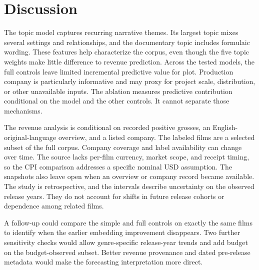 \section{Discussion}

The topic model captures recurring narrative themes. Its largest topic mixes
several settings and relationships, and the documentary topic includes
formulaic wording. These features help characterize the corpus, even though
the five topic weights make little difference to revenue prediction. Across
the tested models, the full controls leave limited incremental predictive
value for plot. Production company is particularly informative and may proxy
for project scale, distribution, or other unavailable inputs. The ablation
measures predictive contribution conditional on the model and the other
controls. It cannot separate those mechanisms.

The revenue analysis is conditional on recorded positive grosses, an
English-original-language overview, and a listed company. The labeled films
are a selected subset of the full corpus. Company coverage and label
availability can change over time. The source lacks per-film currency,
market scope, and receipt timing, so the CPI comparison addresses a
specific nominal USD assumption. The snapshots also leave open when an
overview or company record became available. The study is retrospective,
and the intervals describe uncertainty on the observed release years.
They do not account for shifts in future release cohorts or dependence
among related films.

A follow-up could compare the simple and full controls on exactly the same
films to identify when the earlier embedding improvement disappears. Two
further sensitivity checks would allow genre-specific release-year trends
and add budget on the budget-observed subset. Better revenue provenance and
dated pre-release metadata would make the forecasting interpretation more
direct.

